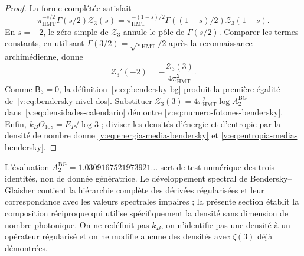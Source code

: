 \begin{proof}
La forme complétée satisfait
\[
 \pi_{\mathrm{HMT}}^{-s/2}\Gamma(s/2)\mathcal Z_3(s)
 =\pi_{\mathrm{HMT}}^{-(1-s)/2}
  \Gamma((1-s)/2)\mathcal Z_3(1-s).
\]
En \(s=-2\), le zéro simple de \(\mathcal Z_3\) annule le pôle de
\(\Gamma(s/2)\). Comparer les termes constants, en utilisant
\(\Gamma(3/2)=\sqrt{\pi_{\mathrm{HMT}}}/2\) après la reconnaissance
archimédienne, donne
\[
 \mathcal Z_3'(-2)=-\frac{\mathcal Z_3(3)}{4\pi_{\mathrm{HMT}}^2}.
\]
Comme \(\mathsf B_3=0\), la définition~\eqref{v:eq:bendersky-bg}
produit la première égalité de~\eqref{v:eq:bendersky-nivel-dos}.
Substituer
\(\mathcal Z_3(3)=4\pi_{\mathrm{HMT}}^2\log A_2^{\mathrm{BG}}\)
dans~\eqref{v:eq:densidades-calendario} démontre
\eqref{v:eq:numero-fotones-bendersky}. Enfin,
\(k_B\Theta_{108}=E_P/\log3\) ; diviser les densités d’énergie et
d’entropie par la densité de nombre donne
\eqref{v:eq:energia-media-bendersky} et
\eqref{v:eq:entropia-media-bendersky}.
\end{proof}

L’évaluation \(A_2^{\mathrm{BG}}=1.0309167521973921\ldots\) sert de
test numérique des trois identités, non de donnée génératrice. Le développement
spectral de Bendersky--Glaisher contient la hiérarchie complète des dérivées
régularisées et leur correspondance avec les valeurs spectrales impaires ; la présente section
établit la composition réciproque qui utilise spécifiquement la densité
sans dimension de nombre photonique. On ne redéfinit pas \(k_B\), on n’identifie pas une densité à un
opérateur régularisé et on ne modifie aucune des densités avec
\(\zeta(3)\) déjà démontrées.
